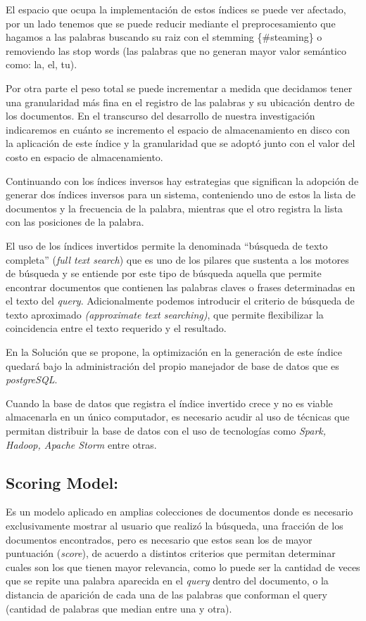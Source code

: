 \documentclass[
  10,
  spanish,
  openany]{book}
\begin{document}
El espacio que ocupa la implementación de estos índices se puede ver afectado, por un lado tenemos que se puede reducir mediante el preprocesamiento que hagamos a las palabras buscando su raiz con el stemming \{\#steaming\} o removiendo las stop words (las palabras que no generan mayor valor semántico como: la, el, tu).

Por otra parte el peso total se puede incrementar a medida que decidamos tener una granularidad más fina en el registro de las palabras y su ubicación dentro de los documentos. En el transcurso del desarrollo de nuestra investigación indicaremos en cuánto se incremento el espacio de almacenamiento en disco con la aplicación de este índice y la granularidad que se adoptó junto con el valor del costo en espacio de almacenamiento.

Continuando con los índices inversos hay estrategias que significan la adopción de generar dos índices inversos para un sistema, conteniendo uno de estos la lista de documentos y la frecuencia de la palabra, mientras que el otro registra la lista con las posiciones de la palabra.

El uso de los índices invertidos permite la denominada ``búsqueda de texto completa'' (\emph{full text search}) que es uno de los pilares que sustenta a los motores de búsqueda y se entiende por este tipo de búsqueda aquella que permite encontrar documentos que contienen las palabras claves o frases determinadas en el texto del \emph{query}. Adicionalmente podemos introducir el criterio de búsqueda de texto aproximado \emph{(approximate text searching)}, que permite flexibilizar la coincidencia entre el texto requerido y el resultado.

En la Solución que se propone, la optimización en la generación de este índice quedará bajo la administración del propio manejador de base de datos que es \emph{postgreSQL}.

Cuando la base de datos que registra el índice invertido crece y no es viable almacenarla en un único computador, es necesario acudir al uso de técnicas que permitan distribuir la base de datos con el uso de tecnologías como \emph{Spark, Hadoop, Apache Storm} entre otras.

\hypertarget{rank}{%
\subsection{Scoring Model:}\label{rank}}

Es un modelo aplicado en amplias colecciones de documentos donde es necesario exclusivamente mostrar al usuario que realizó la búsqueda, una fracción de los documentos encontrados, pero es necesario que estos sean los de mayor puntuación (\emph{score}), de acuerdo a distintos criterios que permitan determinar cuales son los que tienen mayor relevancia, como lo puede ser la cantidad de veces que se repite una palabra aparecida en el \emph{query} dentro del documento, o la distancia de aparición de cada una de las palabras que conforman el query (cantidad de palabras que median entre una y otra).
\end{document}
